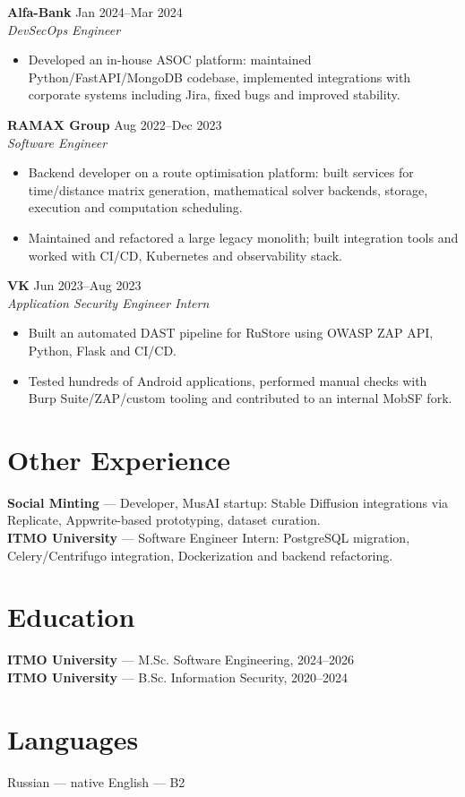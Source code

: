 \documentclass[10pt,a4paper]{article}
\begin{document}
\textbf{Alfa-Bank} \hfill Jan 2024--Mar 2024\\
\textit{DevSecOps Engineer}
\begin{itemize}
  \item Developed an in-house ASOC platform: maintained Python/FastAPI/MongoDB codebase, implemented integrations with corporate systems including Jira, fixed bugs and improved stability.
\end{itemize}

\textbf{RAMAX Group} \hfill Aug 2022--Dec 2023\\
\textit{Software Engineer}
\begin{itemize}
  \item Backend developer on a route optimisation platform: built services for time/distance matrix generation, mathematical solver backends, storage, execution and computation scheduling.
  \item Maintained and refactored a large legacy monolith; built integration tools and worked with CI/CD, Kubernetes and observability stack.
\end{itemize}

\textbf{VK} \hfill Jun 2023--Aug 2023\\
\textit{Application Security Engineer Intern}
\begin{itemize}
  \item Built an automated DAST pipeline for RuStore using OWASP ZAP API, Python, Flask and CI/CD.
  \item Tested hundreds of Android applications, performed manual checks with Burp Suite/ZAP/custom tooling and contributed to an internal MobSF fork.
\end{itemize}

\section*{Other Experience}
\textbf{Social Minting} --- Developer, MusAI startup: Stable Diffusion integrations via Replicate, Appwrite-based prototyping, dataset curation.\\
\textbf{ITMO University} --- Software Engineer Intern: PostgreSQL migration, Celery/Centrifugo integration, Dockerization and backend refactoring.

\section*{Education}
\textbf{ITMO University} --- M.Sc. Software Engineering, 2024--2026\\
\textbf{ITMO University} --- B.Sc. Information Security, 2020--2024

\section*{Languages}
Russian --- native \textbullet{} English --- B2
\end{document}

